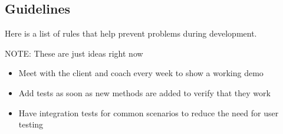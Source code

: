 \subsection{Guidelines}

Here is a list of rules that help prevent problems during development.

{\color{red} NOTE: These are just ideas right now}

\begin{itemize}
	\item Meet with the client and coach every week to show a working demo
	\item Add tests as soon as new methods are added to verify that they work
	\item Have integration tests for common scenarios to reduce the need for user testing
\end{itemize}